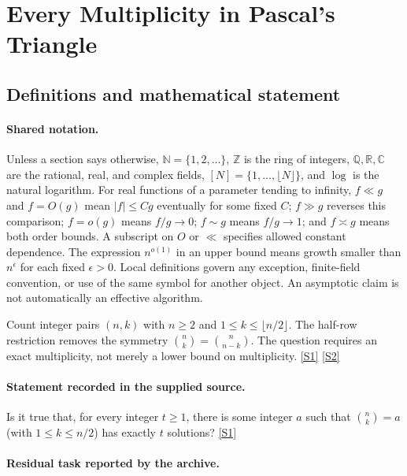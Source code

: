 \documentclass[11pt,a4paper]{article}
\newcommand{\N}{\mathbb{N}}
\newcommand{\Z}{\mathbb{Z}}
\newcommand{\Q}{\mathbb{Q}}
\newcommand{\R}{\mathbb{R}}
\newcommand{\C}{\mathbb{C}}
\newcommand{\sref}[2]{\hyperlink{source:#1:#2}{[S#2]}}
\begin{document}
\section{Every Multiplicity in Pascal's Triangle}\label{statement}


\subsection{Definitions and mathematical statement}

\paragraph{Shared notation.}Unless a section says otherwise, $\N=\{1,2,\ldots\}$,
$\Z$ is the ring of integers, $\Q,\R,\C$ are the rational, real, and complex
fields, $[N]=\{1,\ldots,\lfloor N\rfloor\}$, and $\log$ is the natural
logarithm. For real functions of a parameter tending to infinity,
$f\ll g$ and $f=O(g)$ mean $|f|\leq Cg$ eventually for some fixed $C$;
$f\gg g$ reverses this comparison; $f=o(g)$ means $f/g\to0$;
$f\sim g$ means $f/g\to1$; and $f\asymp g$ means both order bounds.
A subscript on $O$ or $\ll$ specifies allowed constant dependence.
The expression $n^{o(1)}$ in an upper bound means growth smaller than
$n^\epsilon$ for each fixed $\epsilon>0$. Local definitions govern any
exception, finite-field convention, or use of the same symbol for another
object. An asymptotic claim is not automatically an effective algorithm.



Count integer pairs $(n,k)$ with $n\geq2$ and $1\leq k\leq\lfloor n/2\rfloor$. The half-row restriction removes the symmetry $\binom nk=\binom n{n-k}$. The question requires an exact multiplicity, not merely a lower bound on multiplicity. \sref{statement}{1} \sref{statement}{2}

\paragraph{Statement recorded in the supplied source.}
Is it true that, for every integer $t\geq 1$, there is some integer $a$ such that $ \binom{n}{k}=a $ (with $1\leq k\leq n/2$) has exactly $t$ solutions? \sref{statement}{1}

\paragraph{Residual task reported by the archive.}
\end{document}
